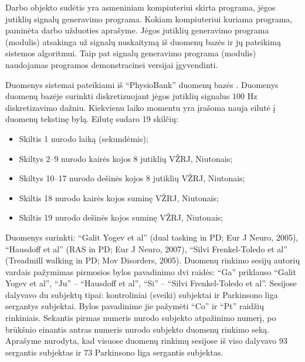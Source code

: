 \documentclass[]{vgtuef}
\begin{document}
Darbo objekto sudėtis yra asmeniniam kompiuteriui skirta programa, jėgos jutiklių signalų generavimo programa. Kokiam kompiuteriui kuriama programa, paminėta darbo užduoties aprašyme. Jėgos jutiklių generavimo programa (modulis) atsakinga už signalų nuskaitymą iš duomenų bazės ir jų pateikimą sistemos algoritmui. Taip pat signalų generavimo programa (modulis) naudojamas programos demonstracinei versijai įgyvendinti.

Duomenys sistemai pateikiami iš ``PhysioBank'' duomenų bazės \cite{932728}. Duomenys duomenų bazėje surinkti diskretizuojant jėgos jutiklių signalus $100$ Hz diskretizavimo dažniu. Kiekvienu laiko momentu yra įrašoma nauja eilutė į duomenų tekstinę bylą. Eilutę sudaro 19 skilčių:

\begin{itemize}
\item Skiltis 1 nurodo laiką (sekundėmis);
\item Skiltys 2--9 nurodo kairės kojos 8 jutiklių VŽRJ, Niutonais;
\item Skiltys 10--17 nurodo dešinės kojos 8 jutiklių VŽRJ, Niutonais;
\item Skiltis 18 nurodo kairės kojos suminę VŽRJ, Niutonais;
\item Skiltis 19 nurodo dešinės kojos suminę VŽRJ, Niutonais;
\end{itemize}


Duomenys surinkti: ``Galit Yogev et al'' (dual tasking in PD; Eur J Neuro, 2005), ``Hausdoff et al'' (RAS in PD; Eur J Neuro, 2007), ``Silvi Frenkel-Toledo et al'' (Treadmill walking in PD; Mov Disorders, 2005). Duomenų rinkimo sesijų autorių vardais pažymimas pirmosios bylos pavadinimo dvi raidės: ``Ga'' priklauso ``Galit Yogev et al'', ``Ju'' -- ``Hausdoff et al'', ``Si'' -- ``Silvi Frenkel-Toledo et al''. Sesijose dalyvavo du subjektų tipai: kontroliniai (sveiki) subjektai ir Parkinsono liga sergantys subjektai. Bylos pavadinime jie pažymėti ``Co'' ir ``Pt'' raidžių rinkiniais. Sekantis pirmas numeris nurodo subjekto atpažinimo numerį, po brūkšnio einantis antras numeris nurodo subjekto duomenų rinkimo seką. Aprašyme nurodyta, kad visuose duomenų rinkimų sesijose iš viso dalyvavo $93$ sergantis subjektas ir $73$ Parkinsono liga sergantis subjektas.

\end{document}
